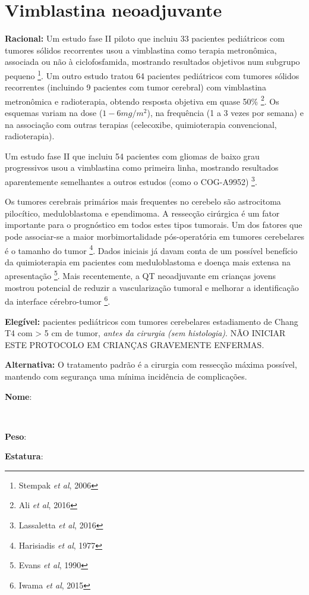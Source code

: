 \documentclass[11pt,a4paper,oldfontcommands]{memoir}
\def\entrywithlabel[#1]#2{\parbox{#1}{{\small #2:} \hrulefill}}
\begin{document}
\section{Vimblastina neoadjuvante}
{\let\thefootnote\relax{}}
\textbf{Racional:} Um estudo fase II piloto que incluiu 33 pacientes pediátricos com tumores sólidos recorrentes usou a vimblastina como terapia metronômica, associada ou não à ciclofosfamida, mostrando resultados objetivos num subgrupo pequeno \footnote{Stempak \textit{et al}, 2006}. Um outro estudo tratou 64 pacientes pediátricos com tumores sólidos recorrentes (incluindo 9 pacientes com tumor cerebral) com vimblastina metronômica e radioterapia, obtendo resposta objetiva em quase 50\% \footnote{Ali \textit{et al}, 2016}. Os esquemas variam na dose ($1-6 mg/m^2$), na frequência (1 a 3 vezes por semana) e na associação com outras terapias (celecoxibe, quimioterapia convencional, radioterapia). 

Um estudo fase II que incluiu 54 pacientes com gliomas de baixo grau progressivos usou a vimblastina como primeira linha, mostrando resultados aparentemente semelhantes a outros estudos (como o COG-A9952) \footnote{Lassaletta \textit{et al}, 2016}.

Os tumores cerebrais primários mais frequentes no cerebelo são astrocitoma pilocítico, meduloblastoma e ependimoma. A ressecção cirúrgica é um fator importante para o prognóstico em todos estes tipos tumorais. Um dos fatores que pode associar-se a maior morbimortalidade pós-operatória em tumores cerebelares é o tamanho do tumor \footnote{Harisiadis \textit{et al}, 1977}. Dados iniciais já davam conta de um possível benefício da quimioterapia em pacientes com meduloblastoma e doença mais extensa na apresentação \footnote{Evans \textit{et al}, 1990}. Mais recentemente, a QT neoadjuvante em crianças jovens mostrou potencial de reduzir a vascularização tumoral e melhorar a identificação da interface cérebro-tumor \footnote{Iwama \textit{et al}, 2015}.

\textbf{Elegível:} pacientes pediátricos com tumores cerebelares estadiamento de Chang T4 com > 5 cm de tumor, \textit{antes da cirurgia (sem histologia)}. NÃO INICIAR ESTE PROTOCOLO EM CRIANÇAS GRAVEMENTE ENFERMAS.

\textbf{Alternativa:}  O tratamento padrão é a cirurgia com ressecção máxima possível, mantendo com segurança uma mínima incidência de complicações. 
\\[0.4cm]
\entrywithlabel[1\hsize]{\textbf{Nome}}\hfill
\\[0.3cm]
\entrywithlabel[.45\hsize]{\textbf{Peso}}\hfill  \entrywithlabel[.45\hsize]{\textbf{Estatura}}
\end{document}
